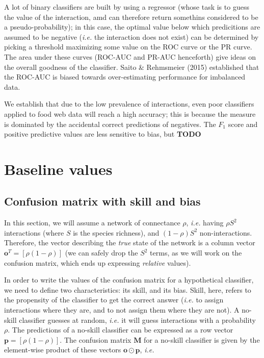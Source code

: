 \documentclass[11pt]{article}
\begin{document}
A lot of binary classifiers are built by using a regressor (whose task
is to guess the value of the interaction, amd can therefore return
somethins considered to be a pseudo-probability); in this case, the
optimal value below which predicitions are assumed to be negative
(\emph{i.e.} the interaction does not exist) can be determined by
picking a threshold maximizing some value on the ROC curve or the PR
curve. The area under these curves (ROC-AUC and PR-AUC henceforth) give
ideas on the overall goodness of the classifier. Saito \& Rehmsmeier
(2015) established that the ROC-AUC is biased towards over-estimating
performance for imbalanced data.

We establish that due to the low prevalence of interactions, even poor
classifiers applied to food web data will reach a high accuracy; this is
because the measure is dominated by the accidental correct predictions
of negatives. The \(F_1\) score and positive predictive values are less
sensitive to bias, but \textbf{TODO}

\hypertarget{baseline-values}{%
\section{Baseline values}\label{baseline-values}}

\hypertarget{confusion-matrix-with-skill-and-bias}{%
\subsection{Confusion matrix with skill and
bias}\label{confusion-matrix-with-skill-and-bias}}

In this section, we will assume a network of connectance \(\rho\),
\emph{i.e.} having \(\rho S^2\) interactions (where \(S\) is the species
richness), and \((1-\rho) S^2\) non-interactions. Therefore, the vector
describing the \emph{true} state of the network is a column vector
\(\mathbf{o}^T = [\rho (1-\rho)]\) (we can safely drop the \(S^2\)
terms, as we will work on the confusion matrix, which ends up expressing
\emph{relative} values).

In order to write the values of the confusion matrix for a hypothetical
classifier, we need to define two characteristics: its skill, and its
bias. Skill, here, refers to the propensity of the classifier to get the
correct answer (\emph{i.e.} to assign interactions where they are, and
to not assign them where they are not). A no-skill classifier guesses at
random, \emph{i.e.} it will guess interactions with a probability
\(\rho\). The predictions of a no-skill classifier can be expressed as a
row vector \(\mathbf{p} = [\rho (1-\rho)]\). The confusion matrix
\(\mathbf{M}\) for a no-skill classifier is given by the element-wise
product of these vectors \(\mathbf{o} \odot \mathbf{p}\), \emph{i.e.}
\end{document}
